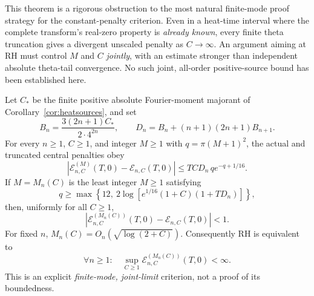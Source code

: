 This theorem is a rigorous obstruction
to the most natural finite-mode proof
strategy for the constant-penalty
criterion. Even in a heat-time interval
where the complete transform's
real-zero property is \emph{already
known}, every finite theta truncation
gives a divergent unscaled penalty as
$C\to\infty$. An argument aiming
at RH must control $M$ and $C$
\emph{jointly}, with an estimate
stronger than independent absolute
theta-tail convergence. No such joint,
all-order positive-source bound has
been established here.


\begin{theorem}
\label{thm:adaptivepenalty}
Let $C_*$ be the finite positive
absolute Fourier-moment majorant of
Corollary~\ref{cor:heatsources}, and set
\[
B_n=\frac{3(2n+1)C_*}{2\cdot4^{2n}},
\qquad
D_n=B_n+(n+1)(2n+1)B_{n+1}.
\]
For every $n\ge1$, $C\ge1$, and
integer $M\ge1$ with
$q=\pi(M+1)^2$, the actual and
truncated central penalties obey
\begin{equation}
\boxed{
|\mathcal E^{(M)}_{n,C}(T,0)-
\mathcal E_{n,C}(T,0)|
\le TC D_n\,q e^{-q+1/16}.
}
\label{eq:adaptivepenaltyerror}
\end{equation}
If $M=M_n(C)$ is the least integer
$M\ge1$ satisfying
\begin{equation}
q\ge
\max\!\left\{12,\
2\log\!\left[e^{1/16}(1+C)(1+TD_n)\right]\right\},
\label{eq:jointcutoff}
\end{equation}
then, uniformly for all $C\ge1$,
\begin{equation}
\boxed{
|\mathcal E^{(M_n(C))}_{n,C}(T,0)-
\mathcal E_{n,C}(T,0)|<1.
}
\label{eq:jointgap}
\end{equation}
For fixed $n$, $M_n(C)=O_n(\sqrt{\log(2+C)})$.
Consequently RH is equivalent to
\[
\forall n\ge1:\quad
\sup_{C\ge1}
\mathcal E^{(M_n(C))}_{n,C}(T,0)<\infty .
\]
This is an explicit \emph{finite-mode,
joint-limit} criterion, not a
proof of its boundedness.
\end{theorem}
